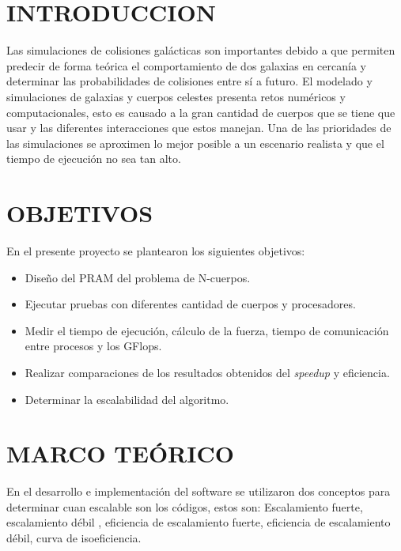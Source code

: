 \documentclass[conference]{IEEEtran}
\begin{document}

\section{INTRODUCCION}
Las simulaciones de colisiones galácticas son importantes debido a que permiten predecir de forma teórica el comportamiento de dos galaxias en cercanía y determinar las probabilidades de colisiones entre sí a futuro.
El modelado y simulaciones de galaxias y cuerpos celestes presenta retos numéricos y computacionales, esto es causado a la gran cantidad de cuerpos que se tiene que usar y las diferentes interacciones que estos manejan. Una de las prioridades de las simulaciones se aproximen lo mejor posible a un escenario realista y que el tiempo de ejecución no sea tan alto.

\section{OBJETIVOS}
\IEEEPARstart {} En el presente proyecto se plantearon los siguientes objetivos:
\begin{itemize}
    \item Diseño del PRAM del problema de N-cuerpos.
    \item Ejecutar pruebas con diferentes cantidad de cuerpos y procesadores.
    \item Medir el tiempo de ejecución, cálculo de la fuerza, tiempo de comunicación entre procesos y los GFlops.
    \item Realizar comparaciones de los resultados obtenidos del \textit{speedup} y eficiencia.
    \item Determinar la escalabilidad del algoritmo.
\end{itemize}

\section{MARCO TEÓRICO}
En el desarrollo e implementación del software se utilizaron dos conceptos para determinar cuan escalable son los códigos, estos son: Escalamiento fuerte, escalamiento débil , eficiencia de escalamiento fuerte, eficiencia de escalamiento débil, curva de isoeficiencia.
\end{document}

